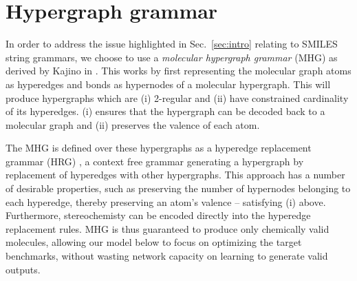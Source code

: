 \documentclass{article}
\begin{document}

\section{Hypergraph grammar}\label{sec:grammar}
In order to address the issue highlighted in Sec.~\ref{sec:intro} relating to SMILES string grammars, we choose to use a {\em molecular hypergraph grammar} (MHG) as derived by Kajino in \cite{kajino2018}. This works by first representing the molecular graph atoms as hyperedges and bonds as hypernodes of a molecular hypergraph. This will produce hypergraphs which are (i) 2-regular and (ii) have constrained cardinality of its hyperedges. (i) ensures that the hypergraph can be decoded back to a molecular graph and (ii) preserves the valence of each atom.

The MHG is defined over these hypergraphs as a hyperedge replacement grammar (HRG) \cite{drewes1997}, a context free grammar generating a hypergraph by replacement of hyperedges with other hypergraphs. This approach has a number of desirable properties, such as preserving the number of hypernodes belonging to each hyperedge, thereby preserving an atom's valence -- satisfying (i) above. Furthermore, stereochemisty can be encoded directly into the hyperedge replacement rules. MHG is thus guaranteed to produce only chemically valid molecules, allowing our model below to focus on optimizing the target benchmarks, without wasting network capacity on learning to generate valid outputs.
\end{document}

